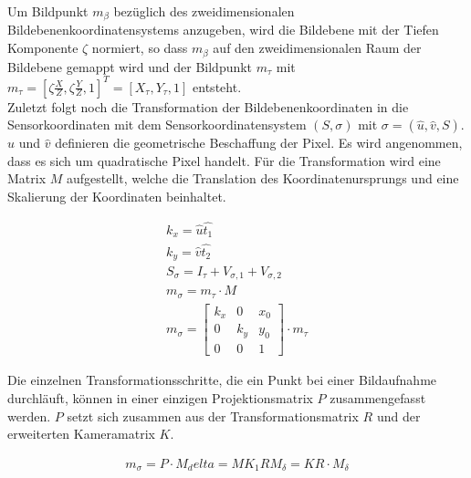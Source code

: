 
Um Bildpunkt $m_\beta$ bezüglich des zweidimensionalen Bildebenenkoordinatensystems anzugeben, wird die Bildebene mit der Tiefen Komponente $\zeta$ normiert, so dass $m_\beta$ auf den zweidimensionalen Raum der Bildebene gemappt wird und der Bildpunkt $m_\tau$ mit $m_\tau = [\zeta \frac{X}{Z},\zeta\frac{Y}{Z},1]^T = [X_\tau, Y_\tau,1]$ entsteht.\\


Zuletzt folgt noch die Transformation der Bildebenenkoordinaten in die Sensorkoordinaten mit dem Sensorkoordinatensystem $(S,\sigma)$ mit $\sigma = (\hat{u},\hat{v},S)$. $\hat{u}$ und $\hat{v}$ definieren die geometrische Beschaffung der Pixel. Es wird angenommen, dass es sich um quadratische Pixel handelt. Für die Transformation wird eine Matrix $M$ aufgestellt, welche die Translation des Koordinatenursprungs und eine Skalierung der Koordinaten beinhaltet.


\begin{gather}	
k_x = \hat{u}\hat{t_1}\\
k_y = \hat{v}\hat{t_2}\\
S_\sigma = I_\tau + V_{\sigma,1} + V_{\sigma,2}\\
	m_\sigma = m_\tau \cdot M\\	
	m_\sigma = \begin{bmatrix}
		k_x&0&x_0\\
		0&k_y&y_0\\
		0&0&1
	\end{bmatrix} \cdot m_\tau 
\end{gather}


Die einzelnen Transformationsschritte, die ein Punkt bei einer Bildaufnahme durchläuft, können in einer einzigen Projektionsmatrix $P$ zusammengefasst werden. $P$ setzt sich zusammen aus der Transformationsmatrix $R$ und der erweiterten Kameramatrix $K$\cite{HZ,Ferid}.

\begin{gather}
	m_\sigma = P \cdot M_delta = MK_1R M_\delta = KR \cdot M_\delta
\end{gather}


